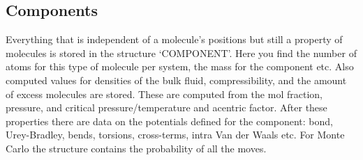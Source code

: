 \subsection*{Components}

Everything that is independent of a molecule's positions but still a property of molecules is stored in the structure `COMPONENT'.
Here you find the number of atoms for this type of molecule per system, the mass for the component etc.
Also computed values for densities of the bulk fluid, compressibility, and the amount of excess molecules are stored. These are computed
from the mol fraction, pressure, and critical pressure/temperature and acentric factor.
After these properties there are data on the potentials defined for the component: bond, Urey-Bradley, bends, torsions, cross-terms, intra Van der Waals etc.
For Monte Carlo the structure contains the probability of all the moves.

